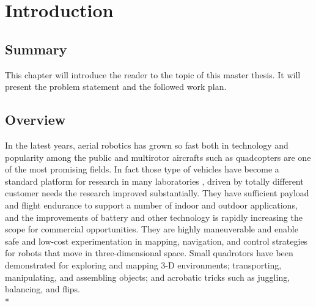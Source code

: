 

\chapter{Introduction}
\label{chap:introduction}
\ifpdf
    \graphicspath{{Introduction/Figures/PNG/}{Introduction/Figures/PDF/}{Introduction/Figures/}}
\else
    \graphicspath{{Introduction/Figures/EPS/}{Introduction/Figures/}}
\fi

\section*{Summary}

This chapter will introduce  the reader to the topic of this master thesis. It will present the problem statement and the followed work plan.

\section{Overview}

In the latest years, aerial robotics has grown so fast both in technology and popularity among the public and multirotor aircrafts such as quadcopters are one of the most promising fields. In fact those type of vehicles have become a standard platform for research in many laboratories , driven by totally different customer needs the research improved substantially. They have sufficient payload and flight endurance to support a number of indoor and outdoor applications, and the improvements of battery and other technology is rapidly increasing the scope for commercial opportunities. They are highly maneuverable and enable safe and low-cost experimentation in mapping, navigation, and control strategies for robots that move in three-dimensional space. Small quadrotors have been demonstrated for exploring and mapping 3-D environments; transporting, manipulating, and assembling objects; and acrobatic tricks such as juggling, balancing, and flips. \\*

